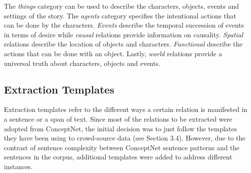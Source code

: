 The \textit{things} category can be used to describe the characters, objects, events and settings of the story. The \textit{agents} category specifies the intentional actions that can be done by the characters. \textit{Events} describe the temporal succession of events in terms of desire while \textit{causal} relations provide information on causality. \textit{Spatial} relations describe the location of objects and characters. \textit{Functional} describe the actions that can be done with an object. Lastly, \textit{world} relations provide a universal truth about characters, objects and events.

\subsection{Extraction Templates}
\label{sec:extractiontemplates}

Extraction templates refer to the different ways a certain relation is manifested in a sentence or a span of text. Since most of the relations to be extracted were adopted from ConceptNet, the initial decision was to just follow the templates they have been using to crowd-source data (see Section 3.4). However, due to the contrast of sentence complexity between ConceptNet sentence patterns and the sentences in the corpus, additional templates were added to address different instances. 

